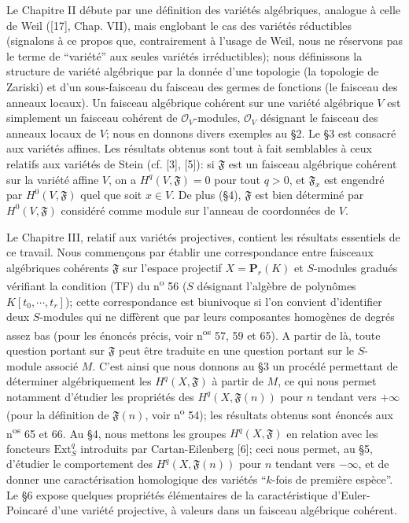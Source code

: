 Le Chapitre II débute par une définition des variétés algébriques, analogue à celle de Weil ([17], Chap. VII), mais englobant le cas des variétés réductibles (signalons à ce propos que, contrairement à l'usage de Weil, nous ne réservons pas le terme de ``variété'' aux seules variétés irréductibles); nous définissons la structure de variété algébrique par la donnée d'une topologie (la topologie de Zariski) et d'un sous-faisceau du faisceau des germes de fonctions (le faisceau des anneaux locaux). Un faisceau algébrique cohérent sur une variété algébrique $V$ est simplement un faisceau cohérent de $\mathcal{O}_V$-modules, $\mathcal{O}_V$ désignant le faisceau des anneaux locaux de $V$; nous en donnons divers exemples au \S2. Le \S3 est consacré aux variétés affines. Les résultats obtenus sont tout à fait semblables à ceux relatifs aux variétés de Stein (cf. [3], [5]): si $\mathfrak{F}$ est un faisceau algébrique
cohérent sur la variété affine $V$, on a $H^q(V, \mathfrak{F}) = 0$ pour tout $q > 0$, et $\mathfrak{F}_x$ est engendré par $H^0(V, \mathfrak{F})$ quel que soit $x \in V$. De plus (\S4), $\mathfrak{F}$ est bien déterminé par $H^0(V, \mathfrak{F})$ considéré comme module sur l'anneau de coordonnées de $V$.

Le Chapitre III, relatif aux variétés projectives, contient les résultats essentiels de ce travail. Nous commençons par établir une correspondance entre faisceaux algébriques cohérents $\mathfrak{F}$ sur l'espace projectif $X = \mathbf{P}_r(K)$ et $S$-modules gradués vérifiant la condition (TF) du n\textsuperscript{o} 56 ($S$ désignant l'algèbre de polynômes $K[t_0 , \cdots , t_r]$); cette correspondance est biunivoque si l'on convient d'identifier deux $S$-modules qui ne diffèrent que par leurs composantes homogènes de degrés assez bas (pour les énoncés précis, voir n\textsuperscript{os} 57, 59 et 65). A partir de là, toute question portant sur $\mathfrak{F}$ peut être traduite en une question portant sur le $S$-module associé $M$. C'est ainsi que nous donnons au \S3 un procédé permettant de déterminer algébriquement les $H^q(X, \mathfrak{F})$ à partir de $M$, ce qui nous permet notamment d'étudier les propriétés des $H^q(X, \mathfrak{F}(n))$ pour $n$ tendant vers $+ \infty$ (pour la définition de $\mathfrak{F}(n)$, voir n\textsuperscript{o} 54); les résultats obtenus sont énoncés aux n\textsuperscript{os} 65 et 66. Au \S4, nous mettons les groupes $H^q(X, \mathfrak{F})$ en relation avec les foncteurs $\mathrm{Ext}^q_S$ introduits par Cartan-Eilenberg [6]; ceci nous permet, au \S5, d'étudier le comportement des $H^q(X, \mathfrak{F}(n))$ pour $n$ tendant vers $- \infty$, et de donner une caractérisation homologique des variétés ``$k$-fois de première espèce''. Le \S6 expose quelques propriétés élémentaires de la caractéristique d'Euler-Poincaré d'une variété projective, à valeurs dans un faisceau algébrique cohérent.

